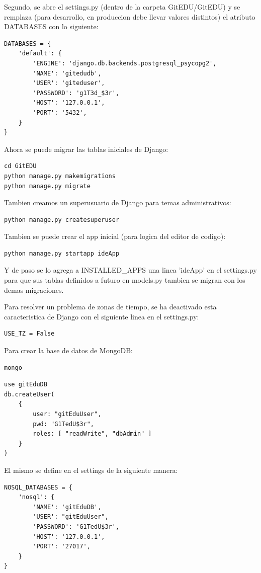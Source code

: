 Segundo, se abre el settings.py (dentro de la carpeta GitEDU/GitEDU) y se remplaza (para desarrollo, en produccion debe llevar valores distintos) el atributo DATABASES con lo siguiente:
\lstset{language=Python}
\begin{lstlisting}
DATABASES = {
    'default': {
        'ENGINE': 'django.db.backends.postgresql_psycopg2',
        'NAME': 'gitedudb',
        'USER': 'giteduser',
        'PASSWORD': 'g1T3d_$3r',
        'HOST': '127.0.0.1',
        'PORT': '5432',
    }
}
\end{lstlisting}
\lstset{language=Bash}

Ahora se puede migrar las tablas iniciales de Django:
\begin{lstlisting}
cd GitEDU
python manage.py makemigrations
python manage.py migrate
\end{lstlisting}

Tambien creamos un superusuario de Django para temas administrativos:
\begin{lstlisting}
python manage.py createsuperuser
\end{lstlisting}

Tambien se puede crear el app inicial (para logica del editor de codigo):
\begin{lstlisting}
python manage.py startapp ideApp
\end{lstlisting}

Y de paso se lo agrega a INSTALLED\_APPS una linea 'ideApp' en el settings.py para que sus tablas definidos a futuro en models.py tambien se migran con los demas migraciones.

Para resolver un problema de zonas de tiempo, se ha deactivado esta caracteristica de Django con el siguiente linea en el settings.py:
\lstset{language=Python}
\begin{lstlisting}
USE_TZ = False
\end{lstlisting}
\lstset{language=Bash}

Para crear la base de datos de MongoDB:
\begin{lstlisting}
mongo
\end{lstlisting}
\lstset{language=sql}
\begin{lstlisting}
use gitEduDB
db.createUser(
    {
        user: "gitEduUser",
        pwd: "G1TedU$3r",
        roles: [ "readWrite", "dbAdmin" ]
    }
)
\end{lstlisting}
\lstset{language=Bash}

El mismo se define en el settings de la siguiente manera:
\lstset{language=Python}
\begin{lstlisting}
NOSQL_DATABASES = {
    'nosql': {
        'NAME': 'gitEduDB',
        'USER': "gitEduUser",
        'PASSWORD': 'G1TedU$3r',
        'HOST': '127.0.0.1',
        'PORT': '27017',
    }
}
\end{lstlisting}
\lstset{language=Bash}

